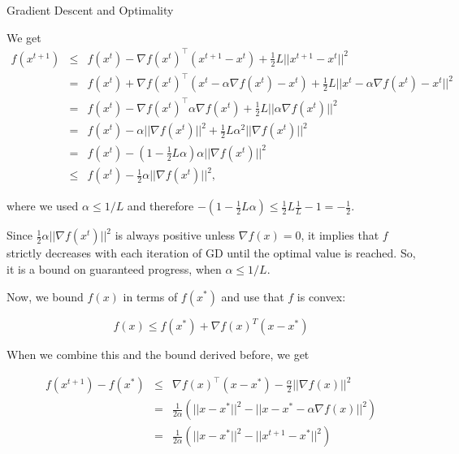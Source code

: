 		\begin{vbframe}{Gradient Descent and Optimality}
			\begin{footnotesize}
			
			We get
			\vspace*{-0.3cm}
			\begin{eqnarray*}
			f(x^{t+1}) &\leq& f(x^t) - \nabla f(x^t)^\top(x^{t+1} - x^t) + \frac{1}{2}L ||x^{t+1} - x^t||^2 \\
			&=& f(x^t) + \nabla f(x^t)^\top(x^t - \alpha \nabla f(x^t) - x^t) + \frac{1}{2}L ||x^{t} - \alpha \nabla f(x^t) - x^t||^2 \\
			& = & f(x^t) - \nabla f(x^t)^\top \alpha  \nabla f(x^t) + \frac{1}{2}L ||\alpha \nabla f(x^t)||^2 \\
			&=& f(x^t) - \alpha ||\nabla f(x^t)||^2 + \frac{1}{2}L\alpha^2 ||\nabla f(x^t)||^2 \\
			&=& f(x^t) - (1 - \frac{1}{2} L \alpha)\alpha  ||\nabla f(x^t)||^2 \\
			&\le& f(x^t) - \frac{1}{2}\alpha ||\nabla f(x^t)||^2, 
			\end{eqnarray*}
		
			where we used $\alpha \leq 1/L$ and therefore $- (1 - \frac{1}{2} L \alpha) \leq \frac{1}{2} L \frac{1}{L} -1 = -\frac{1}{2}$.
						
			Since $\frac{1}{2} \alpha ||\nabla f(x^t)||^2$ is always positive unless $\nabla f(x) = 0$, it implies that $f$ strictly decreases with each iteration of GD until the optimal value is reached. So, it is a bound on guaranteed progress, when $\alpha \leq 1/L$. 
			\end{footnotesize}
			
			\framebreak
			
			Now, we bound $f(x)$ in terms of $f(x^*)$ and use that $f$ is convex: 
			
			$$
			f(x) \leq f(x^*) + \nabla f(x)^T (x - x^*)
			$$ 
			
			When we combine this and the bound derived before, we get
			
			\begin{eqnarray*}
				f(x^{t+1}) - f(x^*) &\leq& \nabla f(x)^\top (x-x^*) - \frac{\alpha}{2}||\nabla f(x)||^2 \\
				&=& \frac{1}{2 \alpha} \left( ||x-x^*||^2 - || x - x^* - \alpha \nabla f(x)||^2 \right) \\
				&=& \frac{1}{2 \alpha} \left( ||x-x^*||^2 - || x^{t+1} - x^* ||^2 \right)
			\end{eqnarray*}
		

\end{vbframe}
